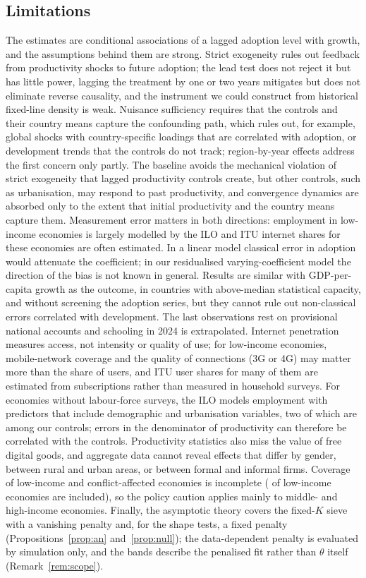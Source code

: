 \documentclass[preprint,12pt,authoryear]{elsarticle}
\begin{document}
\subsection{Limitations}

The estimates are conditional associations of a lagged adoption level with growth, and the assumptions behind them are strong. Strict exogeneity rules out feedback from productivity shocks to future adoption; the lead test does not reject it but has little power, lagging the treatment by one or two years mitigates but does not eliminate reverse causality, and the instrument we could construct from historical fixed-line density is weak. Nuisance sufficiency requires that the controls and their country means capture the confounding path, which rules out, for example, global shocks with country-specific loadings that are correlated with adoption, or development trends that the controls do not track; region-by-year effects address the first concern only partly. The baseline avoids the mechanical violation of strict exogeneity that lagged productivity controls create, but other controls, such as urbanisation, may respond to past productivity, and convergence dynamics are absorbed only to the extent that initial productivity and the country means capture them. Measurement error matters in both directions: employment in low-income economies is largely modelled by the ILO and ITU internet shares for these economies are often estimated. In a linear model classical error in adoption would attenuate the coefficient; in our residualised varying-coefficient model the direction of the bias is not known in general. Results are similar with GDP-per-capita growth as the outcome, in countries with above-median statistical capacity, and without screening the adoption series, but they cannot rule out non-classical errors correlated with development. The last observations rest on provisional national accounts and schooling in 2024 is extrapolated. Internet penetration measures access, not intensity or quality of use; for low-income economies, mobile-network coverage and the quality of connections (3G or 4G) may matter more than the share of users, and ITU user shares for many of them are estimated from subscriptions rather than measured in household surveys. For economies without labour-force surveys, the ILO models employment with predictors that include demographic and urbanisation variables, two of which are among our controls; errors in the denominator of productivity can therefore be correlated with the controls. Productivity statistics also miss the value of free digital goods, and aggregate data cannot reveal effects that differ by gender, between rural and urban areas, or between formal and informal firms. Coverage of low-income and conflict-affected economies is incomplete ( of  low-income economies are included), so the policy caution applies mainly to middle- and high-income economies. Finally, the asymptotic theory covers the fixed-$K$ sieve with a vanishing penalty and, for the shape tests, a fixed penalty (Propositions~\ref{prop:an} and~\ref{prop:null}); the data-dependent penalty is evaluated by simulation only, and the bands describe the penalised fit rather than $\theta$ itself (Remark~\ref{rem:scope}).
\end{document}
